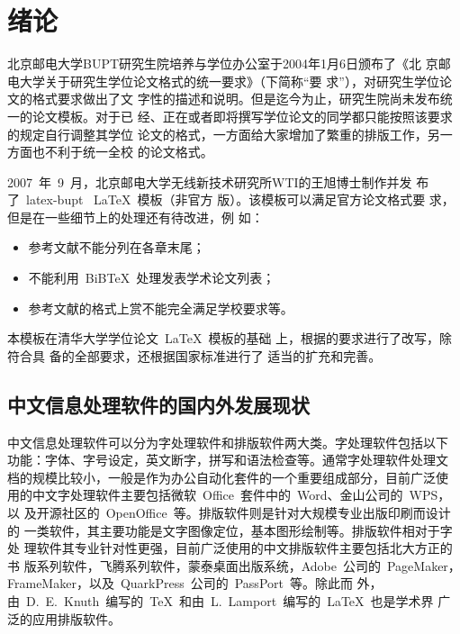 % 

\chapter{绪论}
北京邮电大学\gls*{BUPT}研究生院培养与学位办公室于2004年1月6日颁布了《北
京邮电大学关于研究生学位论文格式的统一要求》（下简称“要
求”）\cite{BUPT_Thesis_Format_2004}，对研究生学位论文的格式要求做出了文
字性的描述和说明。但是迄今为止，研究生院尚未发布统一的论文模板。对于已
经、正在或者即将撰写学位论文的同学都只能按照该要求的规定自行调整其学位
论文的格式，一方面给大家增加了繁重的排版工作，另一方面也不利于统一全校
的论文格式。

2007~年~9~月，北京邮电大学无线新技术研究所\gls*{WTI}的王旭博士制作并发
布了~latex-bupt ~\LaTeX~模板（非官方
版）\cite{latex-bupt}。该模板可以满足官方论文格式要
求\cite{BUPT_Thesis_Format_2004}，但是在一些细节上的处理还有待改进，例
如：
\begin{itemize}
\item 参考文献不能分列在各章末尾；
\item 不能利用~BiBTeX~处理发表学术论文列表；
\item 参考文献的格式上赏不能完全满足学校要求等。
\end{itemize}

本模板在清华大学学位论文~\LaTeX~模板\cite{thuthesis}的基础
上，根据的要求进行了改写，除符合具
备的全部要求，还根据国家标准进行了
适当的扩充和完善。

\section{中文信息处理软件的国内外发展现状}
中文信息处理软件可以分为字处理软件和排版软件两大类。字处理软件包括以下
功能：字体、字号设定，英文断字，拼写和语法检查等。通常字处理软件处理文
档的规模比较小，一般是作为办公自动化套件的一个重要组成部分，目前广泛使
用的中文字处理软件主要包括微软~Office~套件中的~Word、金山公司的~WPS，以
及开源社区的~OpenOffice~等。排版软件则是针对大规模专业出版印刷而设计的
一类软件，其主要功能是文字图像定位，基本图形绘制等。排版软件相对于字处
理软件其专业针对性更强，目前广泛使用的中文排版软件主要包括北大方正的书
版系列软件，飞腾系列软件，蒙泰桌面出版系统，Adobe~公司的~PageMaker，
FrameMaker，以及~QuarkPress~公司的~PassPort~等。除此而
外，由~D.~E.~Knuth~编写的~\TeX~和由~L.~Lamport~编写的~\LaTeX~也是学术界
广泛的应用排版软件。

